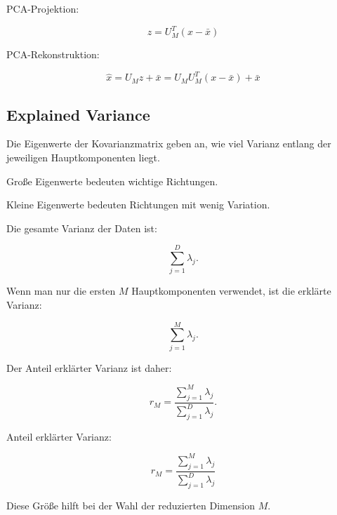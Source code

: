 \documentclass[11pt,a4paper]{scrartcl}
\begin{document}
\begin{answerbox}
    PCA-Projektion:

    \[
        \boxed{
            z = U_M^T(x-\bar x)
        }
    \]

    PCA-Rekonstruktion:

    \[
        \boxed{
            \hat x
            =
            U_M z + \bar x
            =
            U_MU_M^T(x-\bar x)+\bar x
        }
    \]
\end{answerbox}

\subsection{Explained Variance}

\begin{notebox}
    Die Eigenwerte der Kovarianzmatrix geben an, wie viel Varianz entlang der
    jeweiligen Hauptkomponenten liegt.

    Große Eigenwerte bedeuten wichtige Richtungen.

    Kleine Eigenwerte bedeuten Richtungen mit wenig Variation.
\end{notebox}

\begin{calculationbox}
    Die gesamte Varianz der Daten ist:

    \[
        \sum_{j=1}^{D}
        \lambda_j.
    \]

    Wenn man nur die ersten \(M\) Hauptkomponenten verwendet, ist die erklärte
    Varianz:

    \[
        \sum_{j=1}^{M}
        \lambda_j.
    \]

    Der Anteil erklärter Varianz ist daher:

    \[
        r_M
        =
        \frac{
            \sum_{j=1}^{M}
            \lambda_j
        }{
            \sum_{j=1}^{D}
            \lambda_j
        }.
    \]
\end{calculationbox}

\begin{answerbox}
    Anteil erklärter Varianz:

    \[
        \boxed{
            r_M
            =
            \frac{
                \sum_{j=1}^{M}
                \lambda_j
            }{
                \sum_{j=1}^{D}
                \lambda_j
            }
        }
    \]

    Diese Größe hilft bei der Wahl der reduzierten Dimension \(M\).
\end{answerbox}
\end{document}
